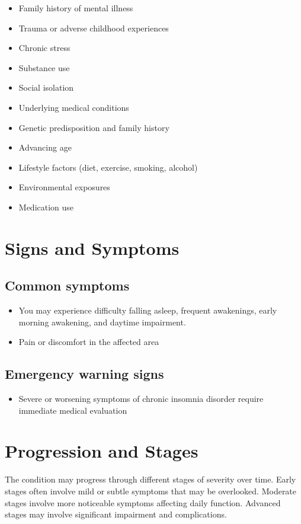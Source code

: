 \begin{itemize}[noitemsep]
  \item Family history of mental illness
  \item Trauma or adverse childhood experiences
  \item Chronic stress
  \item Substance use
  \item Social isolation
  \item Underlying medical conditions
  \item Genetic predisposition and family history
  \item Advancing age
  \item Lifestyle factors (diet, exercise, smoking, alcohol)
  \item Environmental exposures
  \item Medication use
\end{itemize}
\section{Signs and Symptoms}

\subsection{Common symptoms}
\begin{itemize}[noitemsep]
  \item You may experience difficulty falling asleep, frequent awakenings, early morning awakening, and daytime impairment.

  \item Pain or discomfort in the affected area
  \end{itemize}

\subsection{Emergency warning signs}
\begin{itemize}[noitemsep]
  \item Severe or worsening symptoms of chronic insomnia disorder require immediate medical evaluation
\end{itemize}
\section{Progression and Stages}
The condition may progress through different stages of severity over time. Early stages often involve mild or subtle symptoms that may be overlooked. Moderate stages involve more noticeable symptoms affecting daily function. Advanced stages may involve significant impairment and complications.
